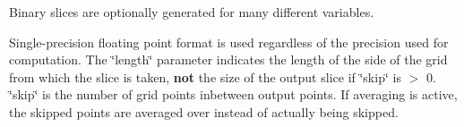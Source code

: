 Binary slices are optionally generated for many different variables.

Single-\/precision floating point format is used regardless of the precision used for computation. The \char`\"{}length\char`\"{} parameter indicates the length of the side of the grid from which the slice is taken, {\bfseries not} the size of the output slice if \char`\"{}skip\char`\"{} is $>$ 0. \char`\"{}skip\char`\"{} is the number of grid points inbetween output points. If averaging is active, the skipped points are averaged over instead of actually being skipped. 